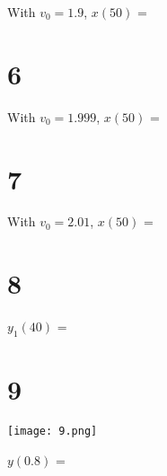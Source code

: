 \documentclass{article}
\begin{document}
With $v_0 = 1.9$, $x(50)$ = 

\section*{6}

With $v_0 = 1.999$, $x(50)$ = 

\section*{7}

With $v_0 = 2.01$, $x(50)$ = 

\section*{8}

$y_1(40)$ = 

\section*{9}

\begin{center}
    \texttt{[image: 9.png]}
\end{center}

$y(0.8)$ = 
\end{document}
